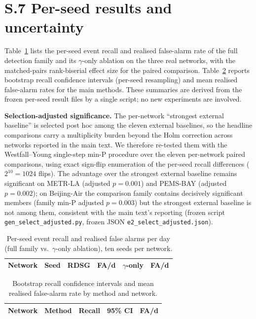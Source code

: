 \documentclass[11pt,a4paper]{article}
\begin{document}
\section*{S.7 Per-seed results and uncertainty}

Table~\ref{tab:suppseed} lists the per-seed event recall and realised
false-alarm rate of the full detection family and its $\gamma$-only
ablation on the three real networks, with the matched-pairs rank-biserial
effect size for the paired comparison.
Table~\ref{tab:suppci} reports bootstrap recall confidence intervals
(per-seed resampling) and mean realised false-alarm rates for the main
methods. These summaries are derived from the frozen per-seed result
files by a single script; no new experiments are involved.

\medskip
\noindent\textbf{Selection-adjusted significance.} The per-network
``strongest external baseline'' is selected post hoc among the eleven
external baselines, so the headline comparisons carry a multiplicity
burden beyond the Holm correction across networks reported in the main
text. We therefore re-tested them with the Westfall--Young single-step
min-P procedure over the eleven per-network paired comparisons, using
exact sign-flip enumeration of the per-seed recall differences
($2^{10}=1024$ flips). The advantage over the strongest external
baseline remains significant on METR-LA (adjusted $p=0.001$) and
PEMS-BAY (adjusted $p=0.002$); on Beijing-Air the comparison family
contains decisively significant members (family min-P adjusted
$p=0.003$) but the strongest external baseline is not among them,
consistent with the main text's reporting (frozen script
\texttt{gen\_select\_adjusted.py}, frozen JSON
\texttt{e2\_select\_adjusted.json}).

\begin{table}[h]\centering\small
\caption{Per-seed event recall and realised false alarms per day
(full family vs.\ $\gamma$-only ablation), ten seeds per network.}
\label{tab:suppseed}
\begin{tabular}{lccccc}
\hline
Network & Seed & RDSG & FA/d & $\gamma$-only & FA/d \\
\hline

\end{tabular}
\end{table}

\begin{table}[h]\centering\small
\caption{Bootstrap recall confidence intervals and mean realised
false-alarm rate by method and network.}
\label{tab:suppci}
\begin{tabular}{llccc}
\hline
Network & Method & Recall & 95\% CI & FA/d \\
\hline

\end{tabular}
\end{table}
\end{document}

